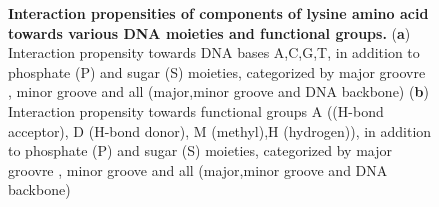 \begin{center}
    \begin{figure}[H]
        \caption[Interaction propensities of components of lysine amino acid towards various DNA moieties and functional groups]{\textbf{ Interaction propensities of components of lysine amino acid towards various DNA moieties and functional groups.} ({\bf a}) Interaction  propensity towards DNA bases  A,C,G,T, in addition to phosphate (P) and sugar (S) moieties, categorized by major groovre , minor groove and all (major,minor groove and DNA backbone) ({\bf b}) Interaction  propensity towards functional groups \citep{Chiu2023} A ((H-bond acceptor), D (H-bond donor), M (methyl),H (hydrogen)), in addition to phosphate (P) and sugar (S) moieties, categorized by major groovre , minor groove and all (major,minor groove and DNA backbone)}
  \label{fig:lys}
\end{figure}
\end{center}

